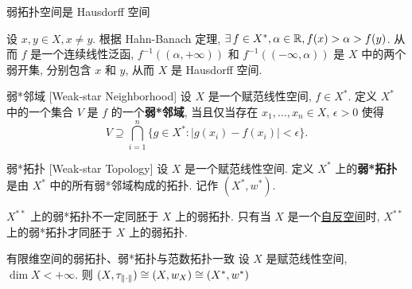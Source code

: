         \begin{ppt}
            {弱拓扑空间是 Hausdorff 空间}
        \end{ppt}

        \begin{prf}
            设 \(x,y\in X, x\neq y\). 根据 Hahn-Banach 定理, \(\exists\,f \in X^*,\alpha\in\operatorname{\mathbb{R}}, f(x)>\alpha>f(y)\). 从而 \(f\) 是一个连续线性泛函, \(f^{-1}((\alpha,+\infty))\) 和 \(f^{-1}((-\infty,\alpha))\) 是 \(X\) 中的两个弱开集, 分别包含 \(x\) 和 \(y\), 从而 \(X\) 是 Hausdorff 空间.
        \end{prf}

        \begin{dfn}
            {弱*邻域}
            [Weak-star Neighborhood]
            设 \(X\) 是一个赋范线性空间, \(f\in X^*\). 定义 \(X^*\) 中的一个集合 \(V\) 是 \(f\) 的一个\textbf{弱*邻域}, 当且仅当存在 \(x_1,\dots,x_n\in X\), \(\epsilon>0\) 使得
            \[V\supseteq\bigcap_{i=1}^n \{g\in X^*: |g(x_i)-f(x_i)|<\epsilon\}.\]
        \end{dfn}

        \begin{dfn}
            {弱*拓扑}
            [Weak-star Topology]
            设 \(X\) 是一个赋范线性空间. 定义 \(X^*\) 上的\textbf{弱*拓扑}是由 \(X^*\) 中的所有弱*邻域构成的拓扑. 记作 \((X^*, w^*)\).
        \end{dfn}

        \begin{rmk}
            [Dedicatia]
            \(X^{**}\) 上的弱*拓扑不一定同胚于 \(X\) 上的弱拓扑. 只有当 \(X\) 是一个\hyperref[dfn:reflexive]{自反空间}时, \(X^{**}\) 上的弱*拓扑才同胚于 \(X\) 上的弱拓扑.
        \end{rmk}

        \begin{thm}
            {有限维空间的弱拓扑、弱*拓扑与范数拓扑一致}
            设 \(X\) 是赋范线性空间, \(\dim X<+\infty\). 则 \((X, \tau_{\norm{\cdot}})\cong (X, w_X) \cong (X^*,w^*)\)
        \end{thm}

